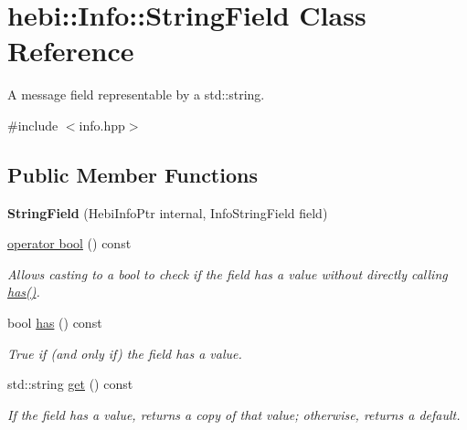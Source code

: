 \hypertarget{classhebi_1_1Info_1_1StringField}{}\section{hebi\+:\+:Info\+:\+:String\+Field Class Reference}
\label{classhebi_1_1Info_1_1StringField}


A message field representable by a std\+::string.  




{\ttfamily \#include $<$info.\+hpp$>$}

\subsection*{Public Member Functions}
\begin{DoxyCompactItemize}
\item 
\mbox{\label{classhebi_1_1Info_1_1StringField_a4a864517189aed3d613b6c55d92b6572}} 
{\bfseries String\+Field} (Hebi\+Info\+Ptr internal, Info\+String\+Field field)
\item 
\hyperlink{classhebi_1_1Info_1_1StringField_a822ffd7b474e7d8285c7cfe598532959}{operator bool} () const
\begin{DoxyCompactList}\small\item\em Allows casting to a bool to check if the field has a value without directly calling {\ttfamily \hyperlink{classhebi_1_1Info_1_1StringField_a54e8e35c43471bc960a6796368d652e5}{has()}}. \end{DoxyCompactList}\item 
\mbox{\label{classhebi_1_1Info_1_1StringField_a54e8e35c43471bc960a6796368d652e5}} 
bool \hyperlink{classhebi_1_1Info_1_1StringField_a54e8e35c43471bc960a6796368d652e5}{has} () const
\begin{DoxyCompactList}\small\item\em True if (and only if) the field has a value. \end{DoxyCompactList}\item 
\mbox{\label{classhebi_1_1Info_1_1StringField_ad7418913b1b9e64fb055eb4f326e3bce}} 
std\+::string \hyperlink{classhebi_1_1Info_1_1StringField_ad7418913b1b9e64fb055eb4f326e3bce}{get} () const
\begin{DoxyCompactList}\small\item\em If the field has a value, returns a copy of that value; otherwise, returns a default. \end{DoxyCompactList}\end{DoxyCompactItemize}


